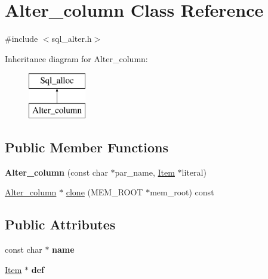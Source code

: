 \hypertarget{classAlter__column}{}\section{Alter\+\_\+column Class Reference}
\label{classAlter__column}


{\ttfamily \#include $<$sql\+\_\+alter.\+h$>$}

Inheritance diagram for Alter\+\_\+column\+:\begin{figure}[H]
\begin{center}
\leavevmode
\includegraphics[height=2.000000cm]{classAlter__column}
\end{center}
\end{figure}
\subsection*{Public Member Functions}
\begin{DoxyCompactItemize}
\item 
\mbox{\label{classAlter__column_acb9485c54d77115ee4e07a04a10383c9}} 
{\bfseries Alter\+\_\+column} (const char $\ast$par\+\_\+name, \mbox{\hyperlink{classItem}{Item}} $\ast$literal)
\item 
\mbox{\hyperlink{classAlter__column}{Alter\+\_\+column}} $\ast$ \mbox{\hyperlink{classAlter__column_aee34d73a1bc5dd1f8638eb7ffbcad07f}{clone}} (M\+E\+M\+\_\+\+R\+O\+OT $\ast$mem\+\_\+root) const
\end{DoxyCompactItemize}
\subsection*{Public Attributes}
\begin{DoxyCompactItemize}
\item 
\mbox{\label{classAlter__column_aaf3eae17e1f0aae1b87d5adbd987d330}} 
const char $\ast$ {\bfseries name}
\item 
\mbox{\label{classAlter__column_a61cb12a5135ac7628b943f3601440d0d}} 
\mbox{\hyperlink{classItem}{Item}} $\ast$ {\bfseries def}
\end{DoxyCompactItemize}
